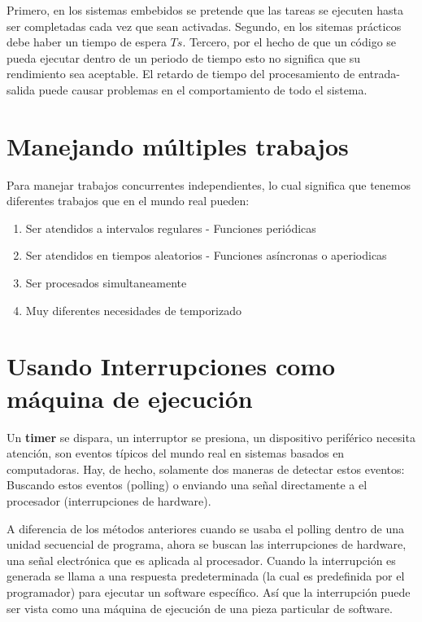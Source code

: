 \documentclass[12pt, twoside]{report}
\begin{document}
Primero, en los sistemas embebidos se pretende que las tareas se ejecuten hasta ser completadas cada vez que sean activadas. Segundo, en los sitemas prácticos debe haber un tiempo de espera $Ts$. Tercero, por el hecho de que un código se pueda ejecutar dentro de un periodo de tiempo esto no significa que su rendimiento sea aceptable. El retardo de tiempo del procesamiento de entrada-salida puede causar problemas en el comportamiento de todo el sistema.


\section{Manejando múltiples trabajos}
Para manejar trabajos concurrentes independientes, lo cual significa que tenemos diferentes trabajos que en el mundo real pueden:
\begin{enumerate}
	\item Ser atendidos a intervalos regulares - Funciones periódicas
	\item Ser atendidos en tiempos aleatorios - Funciones asíncronas o aperiodicas
	\item Ser procesados simultaneamente
	\item Muy diferentes necesidades de temporizado
\end{enumerate}

\section{Usando Interrupciones como máquina de ejecución}

Un \textbf{timer} se dispara, un interruptor se presiona, un dispositivo periférico necesita atención, son eventos típicos del mundo real en sistemas basados en computadoras. Hay, de hecho, solamente dos maneras de detectar estos eventos: Buscando estos eventos (polling) o enviando una señal directamente a el procesador (interrupciones de hardware).

A diferencia de los métodos anteriores cuando se usaba el polling dentro de una unidad secuencial de programa, ahora se buscan las interrupciones de hardware, una señal electrónica que es aplicada al procesador. Cuando la interrupción es generada se llama a una respuesta predeterminada (la cual es predefinida por el programador)  para ejecutar un software específico. Así que la interrupción puede ser vista como una máquina de ejecución de una pieza particular de software.
\end{document}
